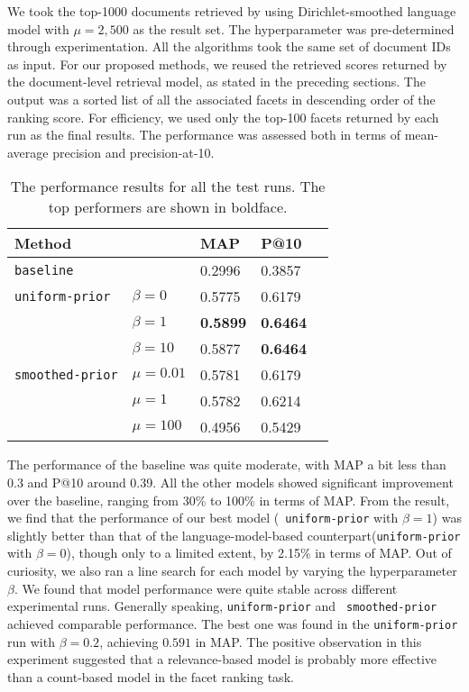 We took the top-1000 documents retrieved by using Dirichlet-smoothed language
model with $\mu = 2,500$ as the result set.  The hyperparameter was
pre-determined through experimentation.  All the algorithms took the same set
of document IDs as input.  For our proposed methods, we reused the retrieved
scores returned by the document-level retrieval model, as stated in the
preceding sections.  The output was a sorted list of all the associated facets
in descending order of the ranking score.  For efficiency, we used only the
top-100 facets returned by each run as the final results.  The performance was
assessed both in terms of mean-average precision and precision-at-10.

\begin{table}[ht!]
  \caption{The performance results for all the test runs.  The top performers are
  shown in boldface.} \label{t:performance}
  \centering
  \begin{tabular}{lllll}
    Method & & MAP & P@10 & \\
    \hline
    {\tt baseline} & & 0.2996 & 0.3857 & \\
    {\tt uniform-prior} & $\beta = 0$ & 0.5775 & 0.6179 & \\
    & $\beta = 1$ & {\bf 0.5899} & {\bf 0.6464} & \\
    & $\beta = 10$ & 0.5877 & {\bf 0.6464} & \\
    {\tt smoothed-prior} & $\mu = 0.01$ & 0.5781 & 0.6179 &\\
    & $\mu = 1$ & 0.5782 & 0.6214 & \\
    & $\mu = 100$ & 0.4956 & 0.5429 &
  \end{tabular}
\end{table}

The performance of the baseline was quite moderate, with MAP a bit less
than 0.3 and P@10 around 0.39.  All the other models showed significant
improvement over the baseline, ranging from 30\% to 100\% in terms of MAP.
From the result, we find that the performance of our best model ({\tt
uniform-prior} with $\beta = 1$) was slightly better than that of the
language-model-based counterpart({\tt uniform-prior}
with $\beta = 0$), though only to a limited extent, by 2.15\% in terms of MAP.
Out of curiosity, we also ran a line search for each model by varying the
hyperparameter $\beta$.  We found that model performance were quite stable
across different experimental runs.  Generally speaking, {\tt uniform-prior} and {\tt
smoothed-prior} achieved comparable performance.  The best one was found in the
{\tt uniform-prior} run with $\beta = 0.2$, achieving $0.591$ in MAP.  The
positive observation in this experiment suggested that a relevance-based
model is probably more effective than a count-based model in the
facet ranking task.  

